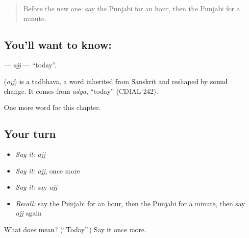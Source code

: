 \label{lesson:PA-C86-ajj}



\begin{quote}
Before the new one: say the Punjabi for an hour, then the Punjabi for a minute.
\end{quote}

\subsection*{You'll want to know: }
\textbf{} — \emph{ajj} — \textquotedblleft{}today\textquotedblright{}.

\begin{cousinweb}
\textbf{} (\emph{ajj}) is a tadbhava, a word inherited from Sanskrit and reshaped by sound change. It comes from \emph{adya}, \textquotedblleft{}today\textquotedblright{} (CDIAL 242).
\end{cousinweb}

\begin{grammarlens}[title={What you've built}]
One more word for this chapter.
\end{grammarlens}

\subsection*{Your turn}
\begin{itemize}
\raggedright
  \item \emph{Say it:} \emph{ajj}
  \item \emph{Say it:} \emph{ajj}, once more
  \item \emph{Say it:} say \emph{ajj}
  \item \emph{Recall:} say the Punjabi for an hour, then the Punjabi for a minute, then say \emph{ajj} again
\end{itemize}

\begin{tcolorbox}[breakable,colback=teal!4,colframe=teal!35!black,title={Before you move on}]
What does  mean? (\textquotedblleft{}Today\textquotedblright{}.) Say it once more.
\end{tcolorbox}
